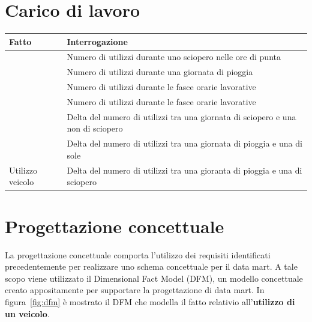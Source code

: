 \section{Carico di lavoro}
\begin{table}[h]
\centering
\begin{tabular}{|l|l|}
\hline
\rowcolor[HTML]{3166FF} 
{\color[HTML]{FFFFFF} \textbf{Fatto}} & {\color[HTML]{FFFFFF} \textbf{Interrogazione}}                                  \\ \hline
                                      & Numero di utilizzi durante uno sciopero nelle ore di punta                      \\ \cline{2-2} 
                                      & Numero di utilizzi durante una giornata di pioggia                              \\ \cline{2-2} 
                                      & Numero di utilizzi durante le fasce orarie lavorative                           \\ \cline{2-2} 
                                      & Numero di utilizzi durante le fasce orarie lavorative                           \\ \cline{2-2} 
                                      & Delta del numero di utilizzi tra una giornata di sciopero e una non di sciopero \\ \cline{2-2} 
                                      & Delta del numero di utilizzi tra una giornata di pioggia e una di sole          \\ \cline{2-2} 
\multirow{-7}{*}{Utilizzo veicolo}    & Delta del numero di utilizzi tra una gioranta di pioggia e una di sciopero      \\ \hline
\end{tabular}
\end{table}
\section{Progettazione concettuale}
La progettazione concettuale comporta l’utilizzo dei requisiti identificati precedentemente 
per realizzare uno schema concettuale per il data mart. A tale scopo viene utilizzato il
Dimensional Fact Model (DFM), un modello concettuale creato appositamente per supportare
la progettazione di data mart. 
In figura~\ref{fig:dfm} è mostrato il DFM che modella il fatto relativio
all'\textbf{utilizzo di un veicolo}.

